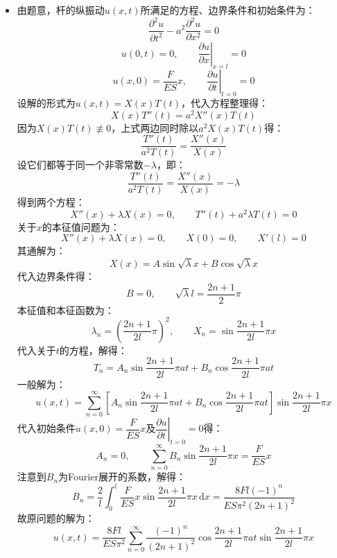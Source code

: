 \documentclass[a4paper,fontset=windows]{ctexart}
\begin{document}
\begin{itemize}

    \item[1.]
    由题意，杆的纵振动$u(x,t)$所满足的方程、边界条件和初始条件为：
    \[
    \frac{\partial^2 u}{\partial t^2} - a^2\frac{\partial^2 u}{\partial x^2} = 0
    \]
    \[
    u(0,t) = 0,\qquad \left.\frac{\partial u}{\partial x}\right|_{x=l} = 0
    \]
    \[
    u(x,0) = \frac{F}{ES}x,\qquad \left.\frac{\partial u}{\partial t}\right|_{t=0} = 0
    \]
    设解的形式为$u(x,t) = X(x)T(t)$，代入方程整理得：
    \[
    X(x)T''(t) = a^2 X''(x)T(t)
    \]
    因为$X(x)T(t) \not\equiv 0$，上式两边同时除以$a^2 X(x)T(t)$得：
    \[
    \frac{T''(t)}{a^2 T(t)} = \frac{X''(x)}{X(x)}
    \]
    设它们都等于同一个非零常数$-\lambda$，即：
    \[
    \frac{T''(t)}{a^2 T(t)} = \frac{X''(x)}{X(x)} = -\lambda
    \]
    得到两个方程：
    \[
    X''(x) + \lambda X(x) = 0,\qquad T''(t) + a^2\lambda T(t) = 0
    \]
    关于$x$的本征值问题为：
    \[
    X''(x) + \lambda X(x) = 0,\qquad X(0) = 0,\qquad X'(l) = 0
    \]
    其通解为：
    \[
    X(x) = A\sin\sqrt{\lambda} x + B\cos\sqrt{\lambda} x
    \]
    代入边界条件得：
    \[
    B = 0,\qquad \sqrt{\lambda} l = \frac{2n+1}{2}\pi
    \]
    本征值和本征函数为：
    \[
    \lambda_n = \left(\frac{2n+1}{2l}\pi\right)^2,\qquad X_n = \sin\frac{2n+1}{2l}\pi x
    \]
    代入关于$t$的方程，解得：
    \[
    T_n = A_n\sin\frac{2n+1}{2l}\pi at + B_n\cos\frac{2n+1}{2l}\pi at
    \]
    一般解为：
    \[
    u(x,t) = \sum_{n=0}^{\infty}\left[A_n\sin\frac{2n+1}{2l}\pi at + B_n\cos\frac{2n+1}{2l}\pi at\right]\sin\frac{2n+1}{2l}\pi x
    \]
    代入初始条件$u(x,0) = \dfrac{F}{ES}x$及$\left.\dfrac{\partial u}{\partial t}\right|_{t=0} = 0$得：
    \[
    A_n = 0,\qquad \sum_{n=0}^{\infty}B_n\sin\frac{2n+1}{2l}\pi x = \frac{F}{ES}x
    \]
    注意到$B_n$为Fourier展开的系数，解得：
    \[
    B_n = \frac{2}{l}\int_0^l\frac{F}{ES}x\sin\frac{2n+1}{2l}\pi x \,\mathrm{d}x = \frac{8Fl(-1)^n}{ES\pi^2(2n+1)^2}
    \]
    故原问题的解为：
    \[
    u(x,t) = \frac{8Fl}{ES\pi^2}\sum_{n=0}^{\infty}\frac{(-1)^n}{(2n+1)^2}\cos\frac{2n+1}{2l}\pi at\sin\frac{2n+1}{2l}\pi x
    \]
    \bigskip


\end{itemize}
\end{document}
